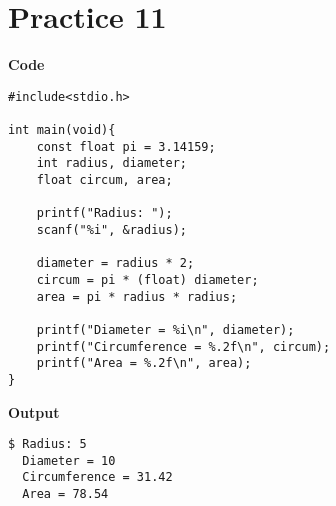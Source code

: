 \documentclass[a4paper, 11pt]{article}
\begin{document}
    \section*{Practice 11}
    \begin{minipage}[t]{0.5\textwidth}
        \large \textbf{Code}
        \begin{lstlisting}[style=code]
#include<stdio.h>

int main(void){
    const float pi = 3.14159;
    int radius, diameter;
    float circum, area;

    printf("Radius: ");
    scanf("%i", &radius);

    diameter = radius * 2;
    circum = pi * (float) diameter;
    area = pi * radius * radius;

    printf("Diameter = %i\n", diameter);
    printf("Circumference = %.2f\n", circum);
    printf("Area = %.2f\n", area);
}
        \end{lstlisting}
    \end{minipage}
    \hspace{0.5cm}
    \begin{minipage}[t]{0.5\textwidth}
        \large \textbf{Output}
        \begin{lstlisting}[style=output]
$ Radius: 5
  Diameter = 10
  Circumference = 31.42
  Area = 78.54
        \end{lstlisting}
    \end{minipage}
\end{document}
